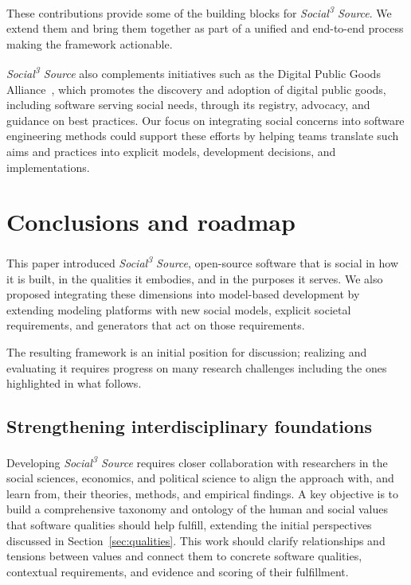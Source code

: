 \documentclass[11pt,a4paper]{article}
\newcommand{\socialsource}{\texorpdfstring{\textit{Social\textsuperscript{3} Source}}{Social3 Source}}
\begin{document}
These contributions provide some of the building blocks for \socialsource{}. 
We extend them and bring them together as part of a unified and end-to-end process
making the framework actionable. 

\socialsource{} also complements initiatives such as the Digital Public Goods Alliance~\cite{DPGA}, which promotes the discovery and adoption of digital public goods, including software serving social needs, through its registry, advocacy, and guidance on best practices.
Our focus on integrating social concerns into software engineering methods could support these efforts by helping teams translate such aims and practices into explicit models, development decisions, and implementations.


\section{Conclusions and roadmap}
\label{sec:discussion}
\label{sec:conclusion}

This paper introduced \socialsource{}, open-source software that is social in how it is built, in the qualities it embodies, and in the purposes it serves.
We also proposed integrating these dimensions into model-based development by extending modeling platforms with new social models, explicit societal requirements, and generators that act on those requirements.

The resulting framework is an initial position for discussion; realizing and evaluating it requires progress on many research challenges including the ones highlighted in what follows.

\subsection{Strengthening interdisciplinary foundations}

Developing \socialsource{} requires closer collaboration with researchers in the social sciences, economics, and political science to align the approach with, and learn from, their theories, methods, and empirical findings.
A key objective is to build a comprehensive taxonomy and ontology of the human and social values that software qualities should help fulfill, extending the initial perspectives discussed in Section~\ref{sec:qualities}.
This work should clarify relationships and tensions between values and connect them to concrete software qualities, contextual requirements, and evidence and scoring of their fulfillment.
\end{document}
